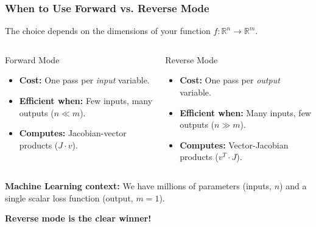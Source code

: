 \documentclass[notes]{beamer}
\begin{document}
\begin{frame}
	\frametitle{When to Use Forward vs. Reverse Mode}
	
	The choice depends on the dimensions of your function $f: \mathbb{R}^n \to \mathbb{R}^m$.
	
	\begin{columns}[T]
		\begin{column}{0.48\textwidth}
			\begin{block}{Forward Mode}
				\begin{itemize}
					\item \textbf{Cost:} One pass per \textit{input} variable.
					\item \textbf{Efficient when:} Few inputs, many outputs ($n \ll m$).
					\item \textbf{Computes:} Jacobian-vector products ($J \cdot v$).
				\end{itemize}
			\end{block}
		\end{column}
		\hfill
		\begin{column}{0.48\textwidth}
			\begin{block}{Reverse Mode}
				\begin{itemize}
					\item \textbf{Cost:} One pass per \textit{output} variable.
					\item \textbf{Efficient when:} Many inputs, few outputs ($n \gg m$).
					\item \textbf{Computes:} Vector-Jacobian products ($v^T \cdot J$).
				\end{itemize}
			\end{block}
		\end{column}
	\end{columns}
	
	\vspace{1cm}
	
	\textbf{Machine Learning context:} We have millions of parameters (inputs, $n$) and a single scalar loss function (output, $m=1$).
	\begin{center}
		\textbf{Reverse mode is the clear winner!}
	\end{center}
	\centering
	\href{https://kks32-courses.github.io/ut-portugal-sciml/00-mlp/ad}{}
	
\end{frame}
\end{document}
